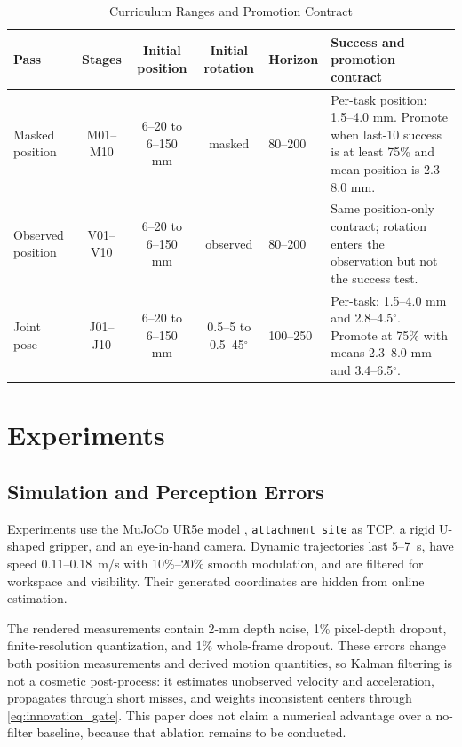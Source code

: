 \documentclass[conference]{IEEEtran}
\begin{document}
\begin{table}[t]
\caption{Curriculum Ranges and Promotion Contract}
\label{tab:curriculum}
\centering
\footnotesize
\setlength{\tabcolsep}{3pt}
\begin{tabular}{@{}lccclp{5.3cm}@{}}
\toprule
Pass & Stages & Initial position & Initial rotation & Horizon & Success and promotion contract \\
\midrule
Masked position & M01--M10 & 6--20 to 6--150 mm & masked & 80--200 & Per-task position: 1.5--4.0 mm. Promote when last-10 success is at least 75\% and mean position is 2.3--8.0 mm. \\
Observed position & V01--V10 & 6--20 to 6--150 mm & observed & 80--200 & Same position-only contract; rotation enters the observation but not the success test. \\
Joint pose & J01--J10 & 6--20 to 6--150 mm & 0.5--5 to 0.5--45$^{\circ}$ & 100--250 & Per-task: 1.5--4.0 mm and 2.8--4.5$^{\circ}$. Promote at 75\% with means 2.3--8.0 mm and 3.4--6.5$^{\circ}$. \\
\bottomrule
\end{tabular}
\end{table}

\section{Experiments}

\subsection{Simulation and Perception Errors}

Experiments use the MuJoCo UR5e model \cite{todorov2012}, \texttt{attachment\_site} as TCP, a rigid U-shaped gripper, and an eye-in-hand camera. Dynamic trajectories last 5--7~s, have speed 0.11--0.18~m/s with 10\%--20\% smooth modulation, and are filtered for workspace and visibility. Their generated coordinates are hidden from online estimation.

The rendered measurements contain 2-mm depth noise, 1\% pixel-depth dropout, finite-resolution quantization, and 1\% whole-frame dropout. These errors change both position measurements and derived motion quantities, so Kalman filtering is not a cosmetic post-process: it estimates unobserved velocity and acceleration, propagates through short misses, and weights inconsistent centers through \eqref{eq:innovation_gate}. This paper does not claim a numerical advantage over a no-filter baseline, because that ablation remains to be conducted.
\end{document}
